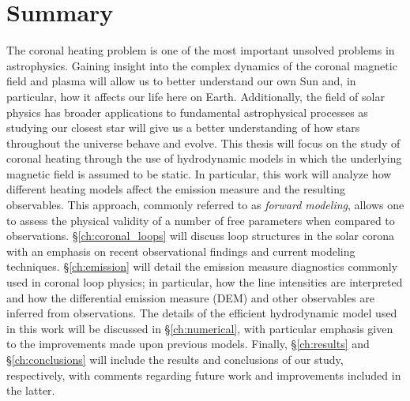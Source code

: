 \section{Summary}
\label{sec:summary}
%
The coronal heating problem is one of the most important unsolved problems in astrophysics. Gaining insight into the complex dynamics of the coronal magnetic field and plasma will allow us to better understand our own Sun and, in particular, how it affects our life here on Earth. Additionally, the field of solar physics has broader applications to fundamental astrophysical processes as studying our closest star will give us a better understanding of how stars throughout the universe behave and evolve. This thesis will focus on the study of coronal heating through the use of hydrodynamic models in which the underlying magnetic field is assumed to be static. In particular, this work will analyze how different heating models affect the emission measure and the resulting observables. This approach, commonly referred to as \textit{forward modeling}, allows one to assess the physical validity of a number of free parameters when compared to observations. \S\ref{ch:coronal_loops} will discuss loop structures in the solar corona with an emphasis on recent observational findings and current modeling techniques. \S\ref{ch:emission} will detail the emission measure diagnostics commonly used in coronal loop physics; in particular, how the line intensities are interpreted and how the differential emission measure (DEM) and other observables are inferred from observations. The details of the efficient hydrodynamic model used in this work will be discussed in \S\ref{ch:numerical}, with particular emphasis given to the improvements made upon previous models. Finally, \S\ref{ch:results} and \S\ref{ch:conclusions} will include the results and conclusions of our study, respectively, with comments regarding future work and improvements included in the latter. 

